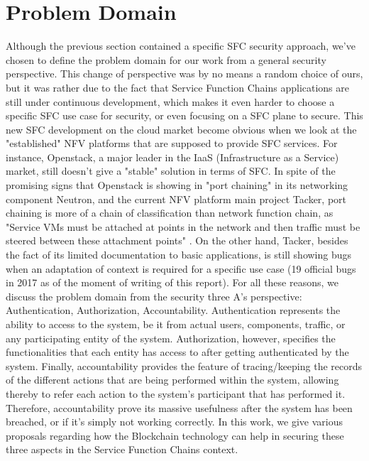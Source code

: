 \section{Problem Domain}
Although the previous section contained a specific SFC security approach, we've chosen to define the problem domain for our work from a general security perspective. This change of perspective was by no means a random choice of ours, but it was rather due to the fact that Service Function Chains applications are still under continuous development, which makes it even harder to choose a specific SFC use case for security, or even focusing on a SFC plane to secure. This new SFC development on the cloud market become obvious when we look at the "established" NFV platforms that are supposed to provide SFC services. For instance, Openstack, a major leader in the IaaS (Infrastructure as a Service) market, still doesn't give a "stable" solution in terms of SFC. In spite of the promising signs that Openstack is showing in "port chaining" in its networking component Neutron, and the current NFV platform main project Tacker, port chaining is more of a chain of classification than network function chain, as "Service VMs must be attached at points in the network and then traffic must be steered between these attachment points" \cite{neutron}. On the other hand, Tacker, besides the fact of its limited documentation to basic applications, is still showing bugs when an adaptation of context is required for a specific use case (19 official bugs in 2017 as of the moment of writing of this report)\cite{bugs}. For all these reasons, we discuss the problem domain from the security three A's perspective: Authentication, Authorization, Accountability.  Authentication represents the ability to access  to the system, be it from actual users, components, traffic, or any participating entity of the system.  Authorization, however, specifies the functionalities that each entity has access to after getting authenticated by the system. Finally, accountability provides the feature of tracing/keeping the records of the different actions that are being performed within the system, allowing thereby to refer each action to the system's participant that has performed it. Therefore, accountability prove its massive usefulness after the system has been breached, or if it's simply not working correctly. In this work, we give various proposals regarding how the Blockchain technology can help in securing these three aspects in the Service Function Chains context. 
